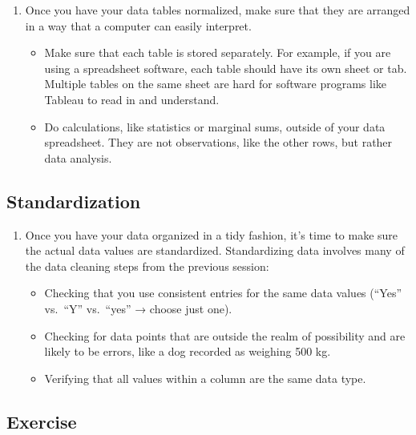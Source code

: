 \documentclass[
]{book}
\begin{document}
\begin{enumerate}
\def\labelenumi{\arabic{enumi}.}
\item
  Once you have your data tables normalized, make sure that they are arranged in a way that a computer can easily interpret.

  \begin{itemize}
  \item
    Make sure that each table is stored separately. For example, if you are using a spreadsheet software, each table should have its own sheet or tab. Multiple tables on the same sheet are hard for software programs like Tableau to read in and understand.
  \item
    Do calculations, like statistics or marginal sums, outside of your data spreadsheet. They are not observations, like the other rows, but rather data analysis.
  \end{itemize}
\end{enumerate}

\hypertarget{standardization}{%
\subsection{Standardization}\label{standardization}}

\begin{enumerate}
\def\labelenumi{\arabic{enumi}.}
\item
  Once you have your data organized in a tidy fashion, it's time to make sure the actual data values are standardized. Standardizing data involves many of the data cleaning steps from the previous session:

  \begin{itemize}
  \item
    Checking that you use consistent entries for the same data values (``Yes'' vs.~``Y'' vs.~``yes'' → choose just one).
  \item
    Checking for data points that are outside the realm of possibility and are likely to be errors, like a dog recorded as weighing 500 kg.
  \item
    Verifying that all values within a column are the same data type.
  \end{itemize}
\end{enumerate}

\hypertarget{exercise}{%
\subsection{Exercise}\label{exercise}}
\end{document}
